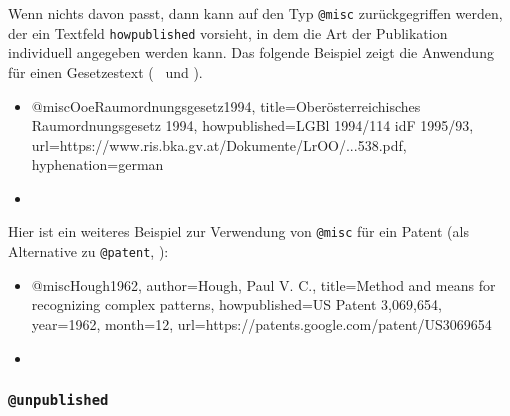 Wenn nichts davon passt, dann kann auf den Typ \texttt{@misc} zurückgegriffen werden, der ein
Textfeld \texttt{howpublished} vorsieht, in dem die Art der Publikation individuell 
angegeben werden kann. Das folgende Beispiel zeigt die Anwendung für einen Gesetzestext 
(\sa\ \cite{FhStG1993} und \cite{EuRichtlinie2000}).
%
\begin{itemize}
\item[]
\begin{GenericCode}[numbers=none]
@misc{OoeRaumordnungsgesetz1994,
  title={Oberösterreichisches Raumordnungsgesetz 1994},
  howpublished={LGBl 1994/114 idF 1995/93},
  url={https://www.ris.bka.gv.at/Dokumente/LrOO/...538.pdf},
  hyphenation={german}
}
\end{GenericCode}
\item[\cite{OoeRaumordnungsgesetz1994}] 
\end{itemize}
%
Hier ist ein weiteres Beispiel zur Verwendung von \texttt{@misc} für ein Patent (als Alternative zu \texttt{@patent}, \so):
%
\begin{itemize}
\item[]
\begin{GenericCode}[numbers=none]
@misc{Hough1962,
	author={Hough, Paul V. C.},
	title={Method and means for recognizing complex patterns},
	howpublished={US Patent 3,069,654},
	year={1962},
	month={12},
	url={https://patents.google.com/patent/US3069654}
}
\end{GenericCode}
\item[\cite{Hough1962}] 
\end{itemize}


\subsubsection{\texttt{@unpublished}}
\label{sec:@unpublished}

